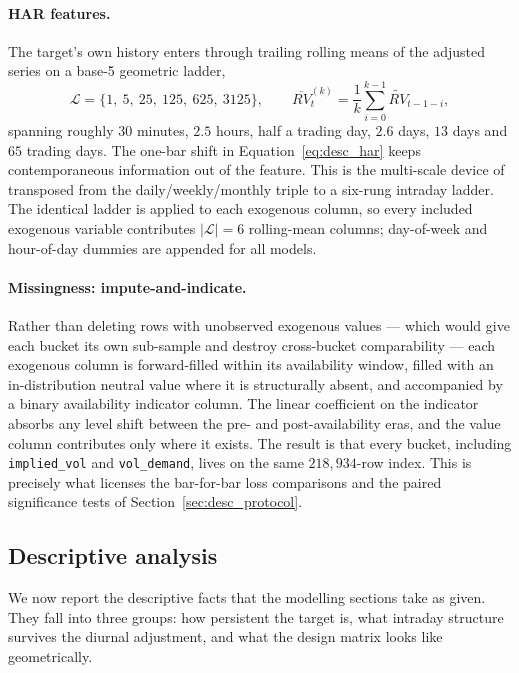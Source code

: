 \paragraph{HAR features.}
The target's own history enters through trailing rolling means of the adjusted
series on a base-5 geometric ladder,
\begin{equation}
    \mathcal{L} = \{1,\ 5,\ 25,\ 125,\ 625,\ 3125\},
    \qquad
    \overline{RV}^{(k)}_t = \frac{1}{k}\sum_{i=0}^{k-1}\widetilde{RV}_{t-1-i},
    \label{eq:desc_har}
\end{equation}
spanning roughly $30$ minutes, $2.5$ hours, half a trading day, $2.6$ days,
$13$ days and $65$ trading days. The one-bar shift in
Equation~\eqref{eq:desc_har} keeps contemporaneous information out of the
feature. This is the multi-scale device of \citet{Corsi2009} transposed from the
daily/weekly/monthly triple to a six-rung intraday ladder. The identical ladder
is applied to each exogenous column, so every included exogenous variable
contributes $|\mathcal{L}| = 6$ rolling-mean columns; day-of-week and hour-of-day
dummies are appended for all models.

\paragraph{Missingness: impute-and-indicate.}
Rather than deleting rows with unobserved exogenous values --- which would give
each bucket its own sub-sample and destroy cross-bucket comparability --- each
exogenous column is forward-filled within its availability window, filled with
an in-distribution neutral value where it is structurally absent, and
accompanied by a binary availability indicator column. The linear coefficient on
the indicator absorbs any level shift between the pre- and post-availability
eras, and the value column contributes only where it exists. The result is that
every bucket, including \texttt{implied\_vol} and \texttt{vol\_demand}, lives on
the same $218{,}934$-row index. This is precisely what licenses the bar-for-bar
loss comparisons and the paired significance tests of
Section~\ref{sec:desc_protocol}.

\subsection{Descriptive analysis}
\label{sec:desc_descriptives}

We now report the descriptive facts that the modelling sections take as given.
They fall into three groups: how persistent the target is, what intraday
structure survives the diurnal adjustment, and what the design matrix looks like
geometrically.

